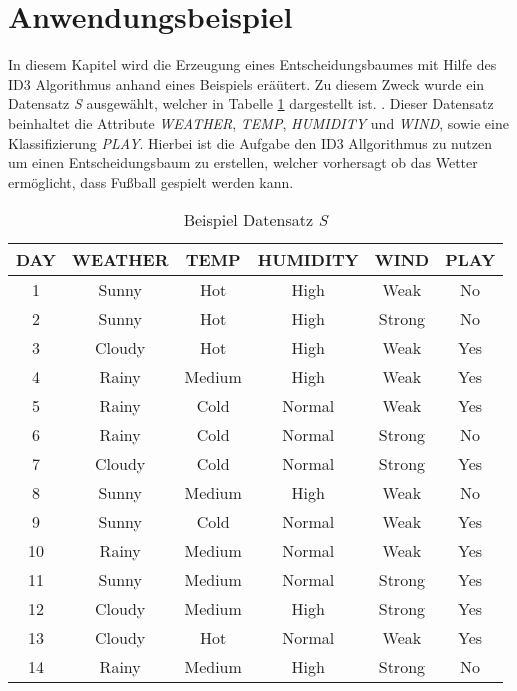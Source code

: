 \section{Anwendungsbeispiel}
\label{id3:datensatz}
In diesem Kapitel wird die Erzeugung eines Entscheidungsbaumes mit Hilfe des ID3 Algorithmus anhand eines Beispiels eräütert. Zu diesem Zweck wurde ein Datensatz \textit{S} ausgewählt, welcher in Tabelle \ref{table:datensatz-original} dargestellt ist. \Autocite{ImplementationID3}. Dieser Datensatz beinhaltet die Attribute \textit{WEATHER}, \textit{TEMP}, \textit{HUMIDITY} und \textit{WIND}, sowie eine Klassifizierung \textit{PLAY}. Hierbei ist die Aufgabe den ID3 Allgorithmus zu nutzen um einen Entscheidungsbaum zu erstellen, welcher vorhersagt ob das Wetter ermöglicht, dass Fußball gespielt werden kann.

\begin{table}[htbp]
    \centering
    \begin{tabular}{cccccc}
        \toprule
        \textbf{DAY} & \textbf{WEATHER} & \textbf{TEMP} & \textbf{HUMIDITY} & \textbf{WIND} & \textbf{PLAY} \\
        \toprule
        1   &Sunny	&Hot	&High	&Weak	&No  \\
        2   &Sunny	&Hot	&High	&Strong	&No  \\
        3   &Cloudy	&Hot	&High	&Weak	&Yes \\
        4   &Rainy	&Medium	&High	&Weak	&Yes \\
        5   &Rainy	&Cold	&Normal	&Weak	&Yes \\
        6   &Rainy	&Cold	&Normal	&Strong	&No  \\
        7   &Cloudy	&Cold	&Normal	&Strong	&Yes \\
        8   &Sunny	&Medium	&High	&Weak	&No  \\
        9   &Sunny	&Cold	&Normal	&Weak	&Yes \\
        10  &Rainy	&Medium	&Normal	&Weak	&Yes \\
        11  &Sunny	&Medium	&Normal	&Strong	&Yes \\
        12  &Cloudy	&Medium	&High	&Strong	&Yes \\
        13  &Cloudy	&Hot	&Normal	&Weak	&Yes \\
        14  &Rainy	&Medium	&High	&Strong	&No  \\
        \bottomrule
    \end{tabular}
    \caption{Beispiel Datensatz \textit{S}}
    \label{table:datensatz-original}
\end{table}

